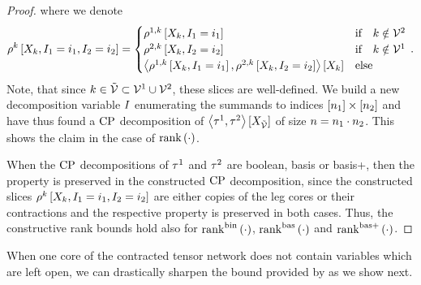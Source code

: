 \begin{proof}
    where we denote
    \begin{align*}
        \rho^{k}\left[X_{k},I_{1}=i_{1},I_{2}=i_{2}\right]
        = \begin{cases}
              \rho^{1,k}\left[X_{k},I_{1}=i_{1}\right]  & \text{if} \quad k \notin \mathcal{V}^{2} \\
              \rho^{2,k}\left[X_{k},I_{2}=i_{2}\right]  & \text{if} \quad k \notin \mathcal{V}^{1} \\
              \left\langle \rho^{1,k}\left[X_{k},I_{1}=i_{1}\right], \rho^{2,k}\left[X_{k},I_{2}=i_{2}\right]\right\rangle \left[ X_{k} \right]  & \text{else}
        \end{cases} \, .
    \end{align*}
    Note, that since $k\in\tilde{\mathcal{V}}\subset\mathcal{V}^{1}\cup\mathcal{V}^{2}$, these slices are well-defined.
    We build a new decomposition variable $I$ enumerating the summands to indices $[n_{1}]\times[n_{2}]$ and have thus found a $\mathrm{CP}$ decomposition of $\left\langle \tau^{1},\tau^{2}\right\rangle \left[ X_{\tilde{\mathcal{V}}} \right]$ of size $n=n_{1}\cdot n_{2}$.
    This shows the claim in the case of $\mathrm{rank}\left(\cdot\right)$.

    When the $\mathrm{CP}$ decompositions of $\tau^{1}$ and $\tau^{2}$ are boolean, basis or basis+, then the property is preserved in the constructed $\mathrm{CP}$ decomposition, since the constructed slices $\rho^{k}\left[X_{k},I_{1}=i_{1},I_{2}=i_{2}\right]$ are either copies of the leg cores or their contractions and the respective property is preserved in both cases.
    Thus, the constructive rank bounds hold also for $\mathrm{rank}^{\mathrm{bin}}\left(\cdot\right)$, $\mathrm{rank}^{\mathrm{bas}}\left(\cdot\right)$ and $\mathrm{rank}^{\mathrm{bas+}}\left(\cdot\right)$.
\end{proof}

When one core of the contracted tensor network does not contain variables which are left open, we can drastically sharpen the bound provided by  as we show next.

